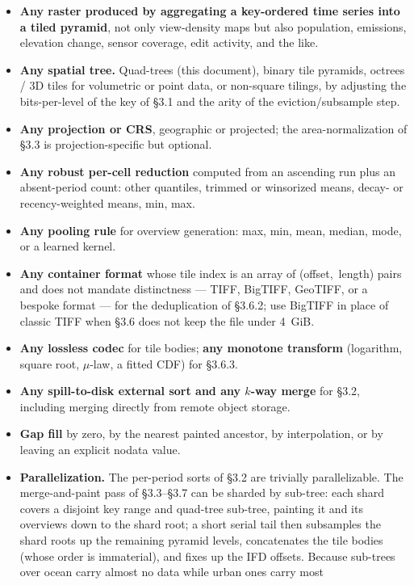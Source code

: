 \documentclass[10pt,twocolumn]{article}
\begin{document}
\begin{itemize}
\item \textbf{Any raster produced by aggregating a key-ordered time series into
  a tiled pyramid}, not only view-density maps but also population, emissions,
  elevation change, sensor coverage, edit activity, and the like.
\item \textbf{Any spatial tree.} Quad-trees (this document), binary tile
  pyramids, octrees / 3D tiles for volumetric or point data, or non-square
  tilings, by adjusting the bits-per-level of the key of \S3.1 and the arity of
  the eviction/subsample step.
\item \textbf{Any projection or CRS}, geographic or projected; the
  area-normalization of \S3.3 is projection-specific but optional.
\item \textbf{Any robust per-cell reduction} computed from an ascending run
  plus an absent-period count: other quantiles, trimmed or winsorized means,
  decay- or recency-weighted means, min, max.
\item \textbf{Any pooling rule} for overview generation: max, min, mean,
  median, mode, or a learned kernel.
\item \textbf{Any container format} whose tile index is an array of
  (offset,~length) pairs and does not mandate distinctness --- TIFF, BigTIFF,
  GeoTIFF, or a bespoke format --- for the deduplication of \S3.6.2; use BigTIFF
  in place of classic TIFF when \S3.6 does not keep the file under 4~GiB.
\item \textbf{Any lossless codec} for tile bodies; \textbf{any monotone
  transform} (logarithm, square root, $\mu$-law, a fitted CDF) for \S3.6.3.
\item \textbf{Any spill-to-disk external sort and any $k$-way merge} for
  \S3.2, including merging directly from remote object storage.
\item \textbf{Gap fill} by zero, by the nearest painted ancestor, by
  interpolation, or by leaving an explicit nodata value.
\item \textbf{Parallelization.} The per-period sorts of \S3.2 are trivially
  parallelizable. The merge-and-paint pass of \S3.3--\S3.7 can be sharded by
  sub-tree: each shard covers a disjoint key range and quad-tree sub-tree,
  painting it and its overviews down to the shard root; a short serial tail
  then subsamples the shard roots up the remaining pyramid levels, concatenates
  the tile bodies (whose order is immaterial), and fixes up the IFD offsets.
  Because sub-trees over ocean carry almost no data while urban ones carry most

\end{itemize}
\end{document}
